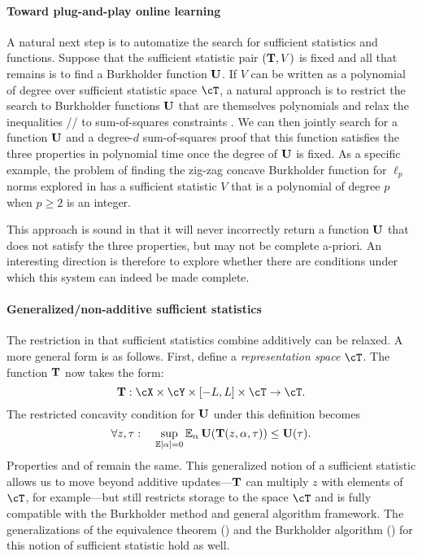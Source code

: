 \paragraph{Toward plug-and-play online learning}
A natural next step is to automatize the search for sufficient statistics and \Bfun functions. Suppose that the sufficient statistic pair $(\mathbf{T}, V)$ is fixed and all that remains is to find a Burkholder function $\mathbf{U}$. If $V$ can be written as a polynomial of degree over sufficient statistic space $\cT$, a natural approach is to restrict the search to Burkholder functions $\mathbf{U}$ that are themselves polynomials and relax the inequalities \propone/\proptwo/\propthree{} to sum-of-squares constraints \citep{barak2014sum}. We can then jointly search for a function $\mathbf{U}$ and a degree-$d$ sum-of-squares proof that this function satisfies the three properties in polynomial time once the degree of $\mathbf{U}$ is fixed. As a specific example, the problem of finding the zig-zag concave Burkholder function for $\ell_p$ norms explored in \cite{foster2017zigzag} has a sufficient statistic $V$ that is a polynomial of degree $p$ when $p\geq{}2$ is an integer. 

This approach is sound in that it will never incorrectly return a function $\mathbf{U}$ that does not satisfy the three properties, but may not be complete a-priori. An interesting direction is therefore to explore whether there are conditions under which this system can indeed be made complete.

\paragraph{Generalized/non-additive sufficient statistics} The restriction in  that sufficient statistics combine additively can be relaxed. A more general form is as follows. First, define a \emph{representation space} $\cT$. The function $\mathbf{T}$ now takes the form:
\[
  \suff: \cX\times{}\cY\times{}\brk*{-L, L}\times{}\cT \to \cT.
\]
The restricted concavity condition for $\mathbf{U}$ under this definition becomes
\[
\forall{}z, \tau:\quad\sup_{\En\brk*{\alpha}=0}\En_{\alpha}\burk\prn*{\suff\prn*{z, \alpha, \tau}} \leq{} \burk(\tau).
\]
Properties \propone{} and \proptwo{} of  remain the same. This generalized notion of a sufficient statistic allows us to move beyond additive updates---$\mathbf{T}$ can multiply $z$ with elements of $\cT$, for example---but still restricts storage to the space $\cT$ and is fully compatible with the Burkholder method and general algorithm framework. The generalizations of the equivalence theorem () and the Burkholder algorithm () for this notion of sufficient statistic hold as well.